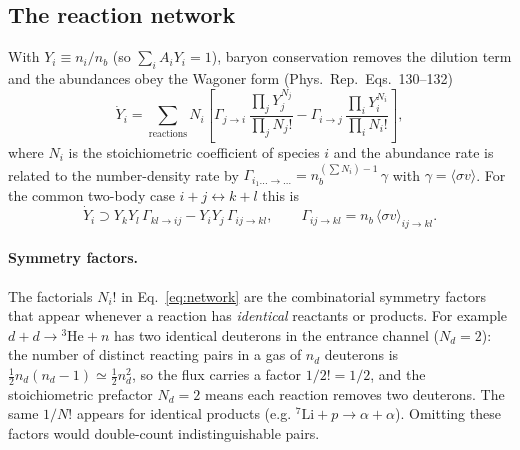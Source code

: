 \documentclass[11pt,a4paper]{article}
\newcommand{\sigmav}{\langle\sigma v\rangle}
\newcommand{\PR}{Phys.\ Rep.}
\begin{document}
\subsection{The reaction network}
With $Y_i\equiv n_i/n_b$ (so $\sum_i A_iY_i=1$), baryon conservation removes the
dilution term and the abundances obey the Wagoner form (\PR\ Eqs.~130--132)
\begin{equation}
  \dot Y_{i} = \sum_{\text{reactions}} N_i\!\left[
      \Gamma_{\!j\to i}\,
      \frac{\textstyle\prod_j Y_j^{N_j}}{\textstyle\prod_j N_j!}
    - \Gamma_{\!i\to j}\,
      \frac{\textstyle\prod_i Y_i^{N_i}}{\textstyle\prod_i N_i!}\right],
\label{eq:network}
\end{equation}
where $N_i$ is the stoichiometric coefficient of species $i$ and the abundance
rate is related to the number-density rate by
$\Gamma_{i_1\dots\to\dots}=n_b^{(\sum N_i)-1}\,\gamma$ with
$\gamma=\sigmav$. For the common two-body case $i+j\leftrightarrow k+l$ this is
\begin{equation}
  \dot Y_i \supset Y_kY_l\,\Gamma_{kl\to ij} - Y_iY_j\,\Gamma_{ij\to kl},
  \qquad \Gamma_{ij\to kl}=n_b\,\sigmav_{ij\to kl}.
\end{equation}

\paragraph{Symmetry factors.}
The factorials $N_i!$ in Eq.~\eqref{eq:network} are the combinatorial symmetry
factors that appear whenever a reaction has \emph{identical} reactants or
products. For example $d+d\to {}^3\mathrm{He}+n$ has two identical deuterons in
the entrance channel ($N_d=2$): the number of distinct reacting pairs in a gas
of $n_d$ deuterons is $\tfrac12 n_d(n_d-1)\simeq\tfrac12 n_d^2$, so the flux
carries a factor $1/2!=1/2$, and the stoichiometric prefactor $N_d=2$ means each
reaction removes two deuterons. The same $1/N!$ appears for identical products
(e.g. $^7\mathrm{Li}+p\to\alpha+\alpha$). Omitting these factors would
double-count indistinguishable pairs.
\end{document}
